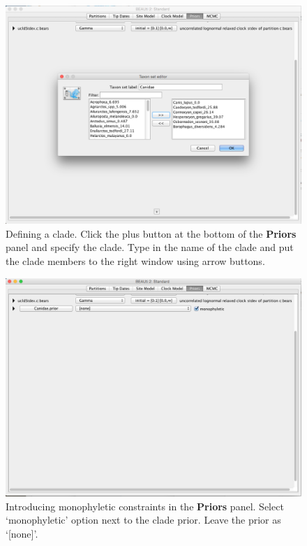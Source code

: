 \documentclass[12pt]{article}
\begin{document}
\begin{figure}	
\centering
\includegraphics[width=\textwidth]{figures/MonophyleticClade}
\caption{Defining a clade. Click the plus button at the bottom of the {\bf Priors} panel and specify the clade. Type in the name of the clade and put the clade members to the right window using arrow buttons. \label{fig:MonophyleticClade}}
\label{fig:BEAUti_ImportNexus}
\end{figure}

\begin{figure}	
\centering
\includegraphics[width=\textwidth]{figures/MonophyleticConstraint}
\caption{Introducing monophyletic constraints in the {\bf Priors} panel. Select `monophyletic' option next to the clade prior. Leave the prior as `[none]'. \label{fig:MonophyleticConstraint}}
\label{fig:BEAUti_ImportNexus}
\end{figure}
\end{document}
